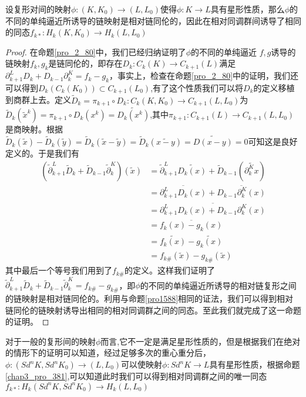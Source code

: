 \begin{proposition}
设复形对间的映射$\phi:(K,K_{0})\rightarrow (L,L_{0})$使得$\phi:K\rightarrow L$具有星形性质，那么$\phi$的不同的单纯逼近所诱导的链映射是相对链同伦的，因此在相对同调群间诱导了相同的同态$f_{k*}:H_{k}(K,K_{0})\rightarrow H_{k}(L,L_{0})$
\end{proposition}
\begin{proof}
在命题\eqref{pro_2_80}中，我们已经归纳证明了$\phi$的不同的单纯逼近 $f,g$诱导的链映射$f_{k},g_{k}$是链同伦的，即存在$D_{k}:C_{k}(K)\rightarrow C_{k+1}(L)$满足$\partial_{k+1}^{L}D_{k}+D_{k-1}\partial_{k}^{K}=f_{k}-g_{k}$，事实上，检查在命题\eqref{pro_2_80}中的证明，我们还可以得到$D_{k}(C_{k}(K_{0}))\subset C_{k+1}(L_{0})$,有了这个性质我们可以将$D_{k}$的定义移植到商群上去。定义$\tilde{D}_{k}=\pi_{k+1}\circ D_{k}:C_{k}(K,K_{0})\rightarrow C_{k+1}(L,L_{0})$为$\tilde{D}_{k}(\tilde{x}^{k})=\pi_{k+1}\circ D_{k}(x^{k})=\widetilde{D_{k}(x^{k})}$,其中$\pi_{k+1}:C_{k+1}(L)\rightarrow C_{k+1}(L,L_{0})$是商映射。根据$\tilde{D}_{k}(\tilde{x})-\tilde{D}_{k}(\tilde{y})=\tilde{D}_{k}(\tilde{x}-\tilde{y})=\tilde{D}_{k}(\tilde{x-y})=\widetilde{D(x-y)}=0$可知这是良好定义的。于是我们有
\begin{equation*}
    \begin{aligned}
    \left(\tilde{\partial}^{L}_{k+1}\tilde{D}_{k}+\tilde{D}_{k-1}\tilde{\partial}_{k}^{K}\right)(\tilde{x})&=\tilde{\partial}^{L}_{k+1}\widetilde{D_{k}(x)}+\tilde{D}_{k-1}(\widetilde{\partial_{k}^{K}x})\\
    &=\overline{\partial^{L}_{k+1}D_{k}(x)}+\overline{D_{k-1}\partial^{K}_{k}(x)}\\
    &=\overline{\partial^{L}_{k+1}D_{k}(x)+D_{k-1}\partial^{K}_{k}(x)}\\
    &=\overline{f_{k}(x)-g_{k}(x)}\\
    &=\widetilde{f_{k}(x)}-\widetilde{g_{k}(x)}\\
    &=f_{k\#}(\tilde{x})-g_{k\#}(\tilde{x})
    \end{aligned}
\end{equation*}
其中最后一个等号我们用到了$f_{k\#}$的定义。这样我们证明了$\tilde{\partial}^{L}_{k+1}\tilde{D}_{k}+\tilde{D}_{k-1}\tilde{\partial}_{k}^{K}=f_{k\#}-g_{k\#}$，即$\phi$的不同的单纯逼近所诱导的相对链复形之间的链映射是相对链同伦的。利用与命题\eqref{pro1588}相同的证法，我们可以得到相对链同伦的链映射诱导出相同的相对同调群之间的同态。至此我们就完成了这一命题的证明。
\end{proof}
对于一般的复形间的映射$\phi$而言,它不一定是满足星形性质的，但是根据我们在绝对的情形下的证明可以知道，经过足够多次的重心重分后，$\phi:(Sd^{n}K,Sd^{n}K_{0})\rightarrow (L,L_{0})$可以使映射$\phi:Sd^{n}K\rightarrow L$具有星形性质，根据命题\eqref{chap3_pro_381},可以知道此时我们可以得到相对同调群之间的唯一同态$f_{k*}:H_{k}(Sd^{n}K,Sd^{n}K_{0})\rightarrow H_{k}(L,L_{0})$

